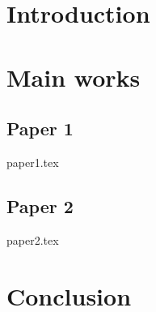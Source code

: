 \documentclass[ %
titlepage,numbers=noenddot,%
                headinclude,footinclude,cleardoublepage=empty,abstract=on,
                BCOR=5mm,paper=a4,fontsize=11pt
                ]{scrreprt}
\theoremstyle{definition}
\begin{document}
\raggedbottom
{} %
\pagestyle{plain}
% 

% 
\cleardoublepage
\cleardoublepage
\cleardoublepage
\cleardoublepage
\cleardoublepage
\pagestyle{scrheadings}

\clearscrheadfoot
\ohead{\rightmark}
\cfoot[\pagemark]{\pagemark}

\cleardoublepage
\part{Introduction}\label{pt:intro}



\cleardoublepage
\part{Main works}\label{pt:main}
% 

\chapter{Paper 1}
{paper1.tex}

\chapter{Paper 2}
{paper2.tex}


\cleardoublepage
\part{Conclusion}\label{pt:end}

\end{document}
